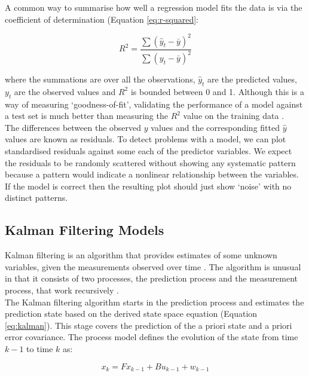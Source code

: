 A common way to summarise how well a regression model fits the data is via the coefficient of determination (Equation \ref{eq:r-squared}:

\begin{equation}
    R^2 = \frac{\sum(\hat y_t - \bar y)^2}{\sum(y_t - \bar y)^2}
    \label{eq:r-squared}
\end{equation}

where the summations are over all the observations, $\hat y_t$ are the predicted values, $y_t$ are the observed values and $R^2$ is bounded between 0 and 1. Although this is a way of measuring `goodness-of-fit', validating the performance of a model against a test set is much better than measuring the $R^2$ value on the training data \cite{forecasting-book}. \\

The differences between the observed $y$ values and the corresponding fitted $\hat y$ values are known as residuals. To detect problems with a model, we can plot standardised residuals against some each of the predictor variables. We expect the residuals to be randomly scattered without showing any systematic pattern because a pattern would indicate a nonlinear relationship between the variables. If the model is correct then the resulting plot should just show `noise' with no distinct patterns. 

\subsection{Kalman Filtering Models}
\label{section:kalman-models-research}

Kalman filtering is an algorithm that provides estimates of some unknown variables, given the measurements observed over time \cite{kalman-korean}. The algorithm is unusual in that it consists of two processes, the prediction process and the measurement process, that work recursively \cite{kalman-malay}.  \\

The Kalman filtering algorithm starts in the prediction process and estimates the prediction state based on the derived state space equation (Equation \ref{eq:kalman}). This stage covers the prediction of the a priori state and a priori error covariance. The process model defines the evolution of the state from time $k-1$ to time $k$ as:

\begin{equation}
\label{eq:kalman}
    x_k = Fx_{k-1} + Bu_{k-1} + w_{k-1}
\end{equation}

